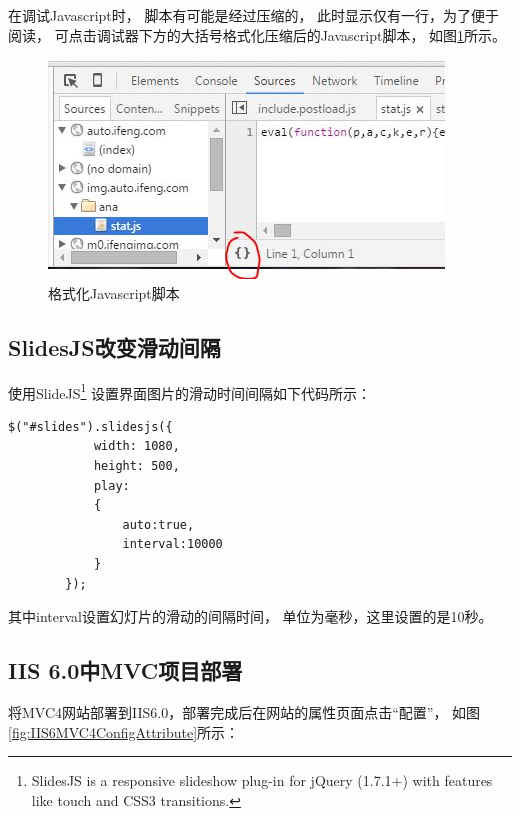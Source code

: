 \documentclass{book}
\begin{document}
在调试Javascript时，
脚本有可能是经过压缩的，
此时显示仅有一行，为了便于阅读，
可点击调试器下方的大括号格式化压缩后的Javascript脚本，
如图\ref{fig:FormatZippedJavascript}所示。

\begin{figure}[htbp]
	\centering
	\includegraphics[scale=0.8]{FormatZippedJavascript.jpg}
	\caption{格式化Javascript脚本}
	\label{fig:FormatZippedJavascript}
\end{figure}

\subsection{SlidesJS改变滑动间隔}

使用SlideJS\footnote{SlidesJS is a responsive slideshow plug-in 
for jQuery (1.7.1+) with features like touch and CSS3 transitions. }
设置界面图片的滑动时间间隔如下代码所示：

\begin{lstlisting}
$("#slides").slidesjs({
			width: 1080,
			height: 500,
			play: 
			{
				auto:true,
				interval:10000
			}
		});
\end{lstlisting}

其中interval设置幻灯片的滑动的间隔时间，
单位为毫秒，这里设置的是10秒。

\subsection{IIS 6.0中MVC项目部署}

将MVC4网站部署到IIS6.0，部署完成后在网站的属性页面点击“配置”，
如图\ref{fig:IIS6MVC4ConfigAttribute}所示：
\end{document}

